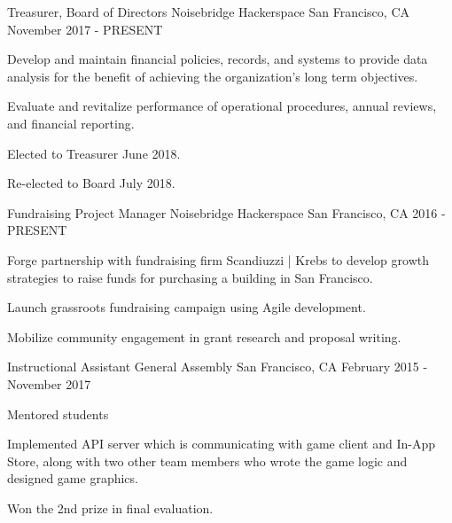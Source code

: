 

\begin{cventries}

  \cventry
    {Treasurer, Board of Directors} %
    {Noisebridge Hackerspace} %
    {San Francisco, CA} %
    {November 2017 - PRESENT} %
    {
      \begin{cvitems} %
        \item {Develop and maintain financial policies, records, and systems to provide data analysis for the benefit of achieving the organization's long term objectives.}
        \item {Evaluate and revitalize performance of operational procedures, annual reviews, and financial reporting.}
        \item {Elected to Treasurer June 2018.}        
        \item {Re-elected to Board July 2018.}
      \end{cvitems}
    }

  \cventry
    {Fundraising Project Manager} %
    {Noisebridge Hackerspace} %
    {San Francisco, CA} %
    {2016 - PRESENT} %
    {
      \begin{cvitems} %
        \item {Forge partnership with fundraising firm Scandiuzzi | Krebs to develop growth strategies to raise funds for purchasing a building in San Francisco.}
        \item {Launch grassroots fundraising campaign using Agile development.}
        \item {Mobilize community engagement in grant research and proposal writing.}
      \end{cvitems}
    }

  \cventry
    {Instructional Assistant} %
    {General Assembly} %
    {San Francisco, CA} %
    {February 2015 - November 2017} %
    {
      \begin{cvitems} %
        \item {Mentored students}
        \item {Implemented API server which is communicating with game client and In-App Store, along with two other team members who wrote the game logic and designed game graphics.}
        \item {Won the 2nd prize in final evaluation.}
      \end{cvitems}
    }


\end{cventries}
